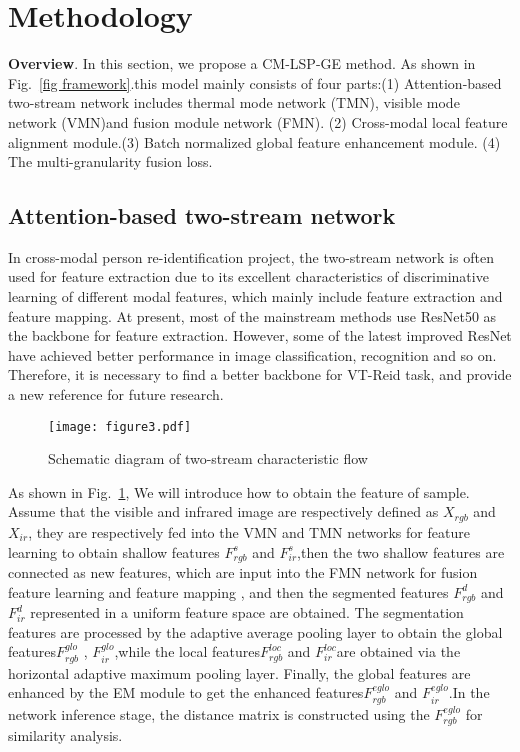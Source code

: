 \documentclass[journal]{IEEEtran}
\begin{document}
\section{Methodology}
\label{section3}
\textbf{Overview}. In this section, we propose a CM-LSP-GE method. As shown in Fig.~\ref{fig framework}.this model mainly consists of four parts:(1) Attention-based two-stream network includes thermal mode network (TMN), visible mode network (VMN)and fusion module network (FMN). (2) Cross-modal local feature alignment module.(3) Batch normalized global feature enhancement module. (4) The multi-granularity fusion loss.	

\subsection{Attention-based two-stream network}
\label{sec:basic}
In cross-modal person re-identification project, the two-stream network is often used for feature extraction due to its excellent characteristics of discriminative learning of different modal features, 
which mainly include feature extraction and feature mapping. At present, most of the mainstream methods use ResNet50 as the backbone for feature extraction. However, some of the latest improved ResNet have achieved better performance in image classification, recognition and so on. Therefore, it is necessary to find a better backbone for VT-Reid task, and provide a new reference for future research.
\vspace{-0.8cm}
\begin{figure}[ht]
	\centering
	\texttt{[image: figure3.pdf]}	
	
	\caption{Schematic diagram of two-stream characteristic flow}
	\label{fig3}
\vspace{-.05in}
\end{figure}

As shown in Fig.~\ref{fig3}, We will introduce how to obtain the feature of sample. Assume that the visible and infrared image are respectively defined as ${X_{rgb}}$ and ${X_{ir}}$, they are respectively fed into the VMN and TMN networks for feature learning to obtain shallow features $F_{rgb}^s$ and $F_{ir}^s$,then the two shallow features are connected as new features, which are input into the FMN network for fusion feature learning and feature mapping , and then the segmented features $F_{rgb}^d$ and $F_{ir}^d$ represented in a uniform feature space are obtained. The segmentation features are processed by the adaptive average pooling layer to obtain the global features$F_{rgb}^{glo}$ , $F_{ir}^{glo}$,while the local features$F_{rgb}^{loc}$ and $F_{ir}^{loc}$are obtained via the horizontal adaptive maximum pooling layer. Finally, the global features are enhanced by the EM module to get the enhanced features$F_{rgb}^{eglo}$ and $F_{ir}^{eglo}$.In the network inference stage, the distance matrix is constructed using the $F_{rgb}^{eglo}$ for similarity analysis.
\end{document}
